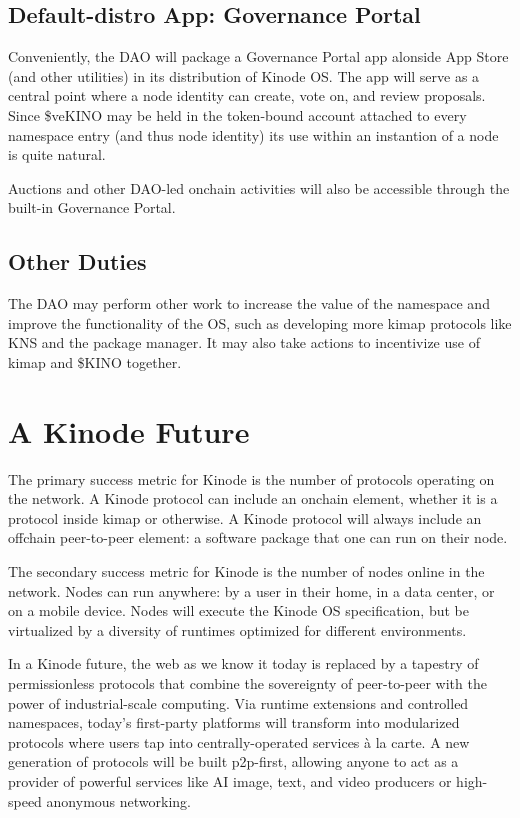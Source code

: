 \documentclass[runningheads]{llncs}
\begin{document}
\subsection{Default-distro App: Governance Portal}

Conveniently, the DAO will package a Governance Portal app alonside App Store (and other utilities) in its distribution of Kinode OS.
The app will serve as a central point where a node identity can create, vote on, and review proposals.
Since \$veKINO may be held in the token-bound account attached to every namespace entry (and thus node identity) its use within an instantion of a node is quite natural.

Auctions and other DAO-led onchain activities will also be accessible through the built-in Governance Portal.

\subsection{Other Duties}

The DAO may perform other work to increase the value of the namespace and improve the functionality of the OS, such as developing more kimap protocols like KNS and the package manager.
It may also take actions to incentivize use of kimap and \$KINO together.

\section{A Kinode Future}

The primary success metric for Kinode is the number of protocols operating on the network.
A Kinode protocol can include an onchain element, whether it is a protocol inside kimap or otherwise.
A Kinode protocol will always include an offchain peer-to-peer element: a software package that one can run on their node.

The secondary success metric for Kinode is the number of nodes online in the network.
Nodes can run anywhere: by a user in their home, in a data center, or on a mobile device.
Nodes will execute the Kinode OS specification, but be virtualized by a diversity of runtimes optimized for different environments.

In a Kinode future, the web as we know it today is replaced by a tapestry of permissionless protocols that combine the sovereignty of peer-to-peer with the power of industrial-scale computing.
Via runtime extensions and controlled namespaces, today's first-party platforms will transform into modularized protocols where users tap into centrally-operated services à la carte.
A new generation of protocols will be built p2p-first, allowing anyone to act as a provider of powerful services like AI image, text, and video producers or high-speed anonymous networking.
\end{document}
